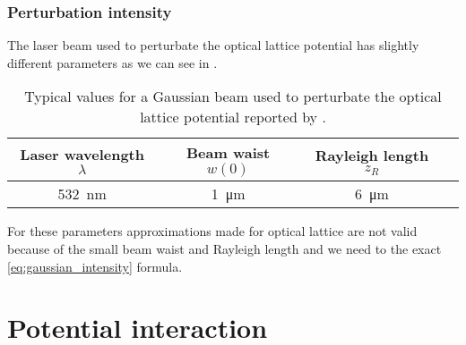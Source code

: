 \subsubsection{Perturbation intensity}

The laser beam used to perturbate the optical lattice potential has slightly
different parameters \cite{Hertlein2017} as we can see in
.
\begin{table}[h]
  \centering
  \begin{tabular}{|c|c|c|c|}
    \hline
    Laser wavelength $\lambda$ &
    Beam waist $w(0)$ &
    Rayleigh length $z_R$ \\
    \hline
    \SI{532}{\nano\meter} &
    \SI{1}{\micro\meter} &
    \SI{6}{\micro\meter} \\
    \hline
  \end{tabular}
  \captionsetup{width=.8\textwidth}
  \caption{Typical values for a Gaussian beam used to perturbate the optical
    lattice potential reported by \cite{Hertlein2017}.}
  \label{tab:gaussian_beam_perturbation}
\end{table}
For these parameters approximations made for optical lattice are not valid
because of the small beam waist and Rayleigh length and we need to the exact
\cref{eq:gaussian_intensity} formula.

\section{Potential interaction}

